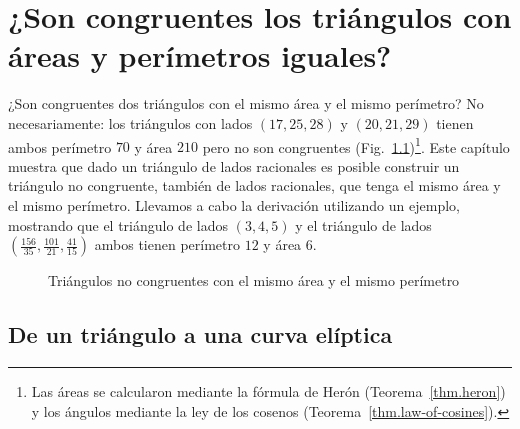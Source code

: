 
\chapter{¿Son congruentes los triángulos con áreas y perímetros iguales?}\label{c.congruent}


¿Son congruentes dos triángulos con el mismo área y el mismo perímetro? No necesariamente: los triángulos con lados $(17,25,28)$ y $(20,21,29)$ tienen ambos perímetro $70$ y área $210$ pero no son congruentes (Fig.~\ref{f.congruent-first-example})\footnote{Las áreas se calcularon mediante la fórmula de Herón (Teorema~\ref{thm.heron}) y los ángulos mediante la ley de los cosenos (Teorema~\ref{thm.law-of-cosines}).}. Este capítulo muestra que dado un triángulo de lados racionales es posible construir un triángulo no congruente, también de lados racionales, que tenga el mismo área y el mismo perímetro.
Llevamos a cabo la derivación utilizando un ejemplo, mostrando que el triángulo de lados $(3,4,5)$ y el triángulo de lados 
$\left(\frac{156}{35}, \frac{101}{21}, \frac{41}{15}\right)$ ambos tienen  perímetro $12$ y área $6$.

\begin{figure}[b]
\begin{center}
\end{center}
\caption{Triángulos no congruentes con el mismo área y el mismo perímetro}\label{f.congruent-first-example}
\end{figure}

\section{De un triángulo a una curva elíptica}\label{s.elliptic}

